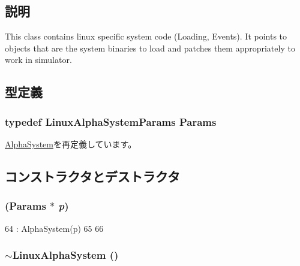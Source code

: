 \subsection{説明}
This class contains linux specific system code (Loading, Events). It points to objects that are the system binaries to load and patches them appropriately to work in simulator. 

\subsection{型定義}
\hypertarget{classLinuxAlphaSystem_a0d8e2379ed014b6039c45eb98c24fed4}{
\subsubsection[{Params}]{\setlength{\rightskip}{0pt plus 5cm}typedef LinuxAlphaSystemParams {\bf Params}}}
\label{classLinuxAlphaSystem_a0d8e2379ed014b6039c45eb98c24fed4}


\hyperlink{classAlphaSystem_a2af24d7a564ee2ca81332fb46406cbe5}{AlphaSystem}を再定義しています。

\subsection{コンストラクタとデストラクタ}
\hypertarget{classLinuxAlphaSystem_a24f1bfc0f81c6de9ba2424a337ba7144}{
\subsubsection[{LinuxAlphaSystem}]{ ({\bf Params} $\ast$ {\em p})}}
\label{classLinuxAlphaSystem_a24f1bfc0f81c6de9ba2424a337ba7144}



\begin{DoxyCode}
64     : AlphaSystem(p)
65 {
66 }
\end{DoxyCode}
\hypertarget{classLinuxAlphaSystem_a09db0385b0436f3fb000069afd5d1032}{
\subsubsection[{$\sim$LinuxAlphaSystem}]{\setlength{\rightskip}{0pt plus 5cm}$\sim${\bf LinuxAlphaSystem} ()}}
\label{classLinuxAlphaSystem_a09db0385b0436f3fb000069afd5d1032}



